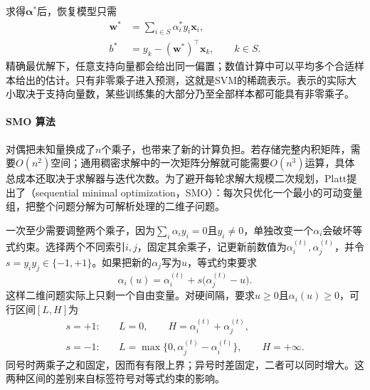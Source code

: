 求得$\bm{\alpha}^{\ast}$后，恢复模型只需
\begin{equation}
  \begin{aligned}
    \bm{w}^{\ast}
      &=\sum_{i\in S}\alpha_i^{\ast}y_i\bm{x}_i,\\
    b^{\ast}
      &=y_k-(\bm{w}^{\ast})^{\top}\bm{x}_k,
        \qquad k\in S.
  \end{aligned}
  \label{eq:classification-svm-recover}
\end{equation}
精确最优解下，任意支持向量都会给出同一偏置；数值计算中可以平均多个合适样本给出的估计。只有非零乘子进入预测，这就是SVM的稀疏表示。表示的实际大小取决于支持向量数，某些训练集的大部分乃至全部样本都可能具有非零乘子。

\paragraph{SMO 算法}
\label{sec:classification-svm-smo}

对偶把未知量换成了$n$个乘子，也带来了新的计算负担。若存储完整内积矩阵，需要$O(n^2)$空间；通用稠密求解中的一次矩阵分解就可能需要$O(n^3)$运算，具体总成本还取决于求解器与迭代次数。为了避开每轮求解大规模二次规划，Platt提出了（sequential minimal optimization，SMO）：每次只优化一个最小的可动变量组，把整个问题分解为可解析处理的二维子问题。

一次至少需要调整两个乘子，因为$\sum_i\alpha_i y_i=0$且$y_i\ne0$，单独改变一个$\alpha_i$会破坏等式约束。选择两个不同索引$i,j$，固定其余乘子，记更新前数值为$\alpha_i^{(t)},\alpha_j^{(t)}$，并令$s=y_i y_j\in\{-1,+1\}$。如果把新的$\alpha_j$写为$u$，等式约束要求
\begin{equation}
  \alpha_i(u)
  =\alpha_i^{(t)}
    +s\bigl(\alpha_j^{(t)}-u\bigr).
  \label{eq:classification-svm-smo-coupling}
\end{equation}
这样二维问题实际上只剩一个自由变量。对硬间隔，要求$u\ge0$且$\alpha_i(u)\ge0$，可行区间$[L,H]$为
\begin{equation}
  \begin{aligned}
    s=+1:\quad&
      L=0,\qquad H=\alpha_i^{(t)}+\alpha_j^{(t)},\\
    s=-1:\quad&
      L=\max\{0,\alpha_j^{(t)}-\alpha_i^{(t)}\},
      \qquad H=+\infty.
  \end{aligned}
  \label{eq:classification-svm-smo-hard-interval}
\end{equation}
同号时两乘子之和固定，因而有有限上界；异号时差固定，二者可以同时增大。这两种区间的差别来自标签符号对等式约束的影响。


